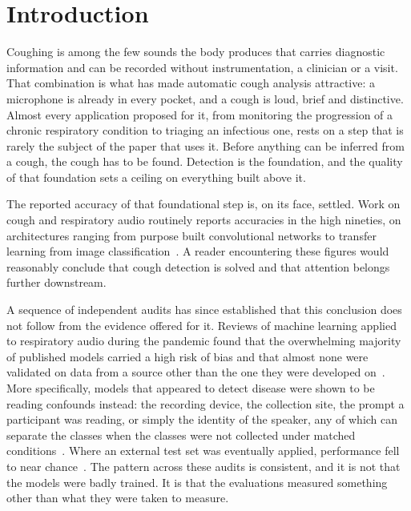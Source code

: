 \documentclass[pdflatex,sn-mathphys-num]{sn-jnl}
\newcommand{\parstart}[2]{#1#2}
\begin{document}
\maketitle

\section{Introduction}\label{sec:intro}

\parstart{C}{oughing} is among the few sounds the body produces that carries diagnostic information and
can be recorded without instrumentation, a clinician or a visit. That combination is what
has made automatic cough analysis attractive: a microphone is already in every pocket, and
a cough is loud, brief and distinctive. Almost every application proposed for it, from
monitoring the progression of a chronic respiratory condition to triaging an infectious
one, rests on a step that is rarely the subject of the paper that uses it. Before anything
can be inferred from a cough, the cough has to be found. Detection is the foundation, and
the quality of that foundation sets a ceiling on everything built above it.

The reported accuracy of that foundational step is, on its face, settled. Work on cough
and respiratory audio routinely reports accuracies in the high nineties, on architectures
ranging from purpose built convolutional networks to transfer learning from image
classification~\cite{imran2020, laguarta2020, pahar2021}. A reader encountering these
figures would reasonably conclude that cough detection is solved and that attention
belongs further downstream.

A sequence of independent audits has since established that this conclusion does not
follow from the evidence offered for it. Reviews of machine learning applied to
respiratory audio during the pandemic found that the overwhelming majority of published
models carried a high risk of bias and that almost none were validated on data from a
source other than the one they were developed on~\cite{roberts2021}. More specifically,
models that appeared to detect disease were shown to be reading confounds instead: the
recording device, the collection site, the prompt a participant was reading, or simply the
identity of the speaker, any of which can separate the classes when the classes were not
collected under matched conditions~\cite{han2022, coppock2024}. Where an external test set
was eventually applied, performance fell to near chance~\cite{xia2021, zhou2021}. The
pattern across these audits is consistent, and it is not that the models were badly
trained. It is that the evaluations measured something other than what they were taken to
measure.
\end{document}
